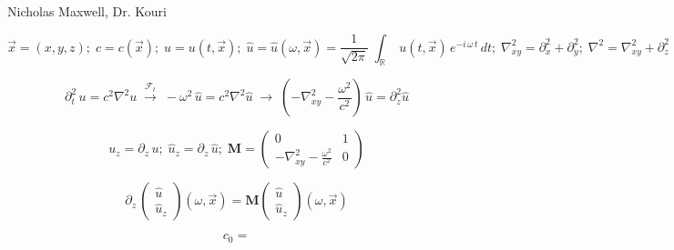 \documentclass[12pt]{article}
\newcommand{\twomat}[4]{ \left( \begin{array}{cc} #1 & #2 \\ #3 & #4  \end{array} \right) }
\newcommand{\twovec}[2]{ \left( \begin{array}{c} #1  \\ #2   \end{array} \right) }
\begin{document}
\begin{flushleft}
Nicholas Maxwell, Dr. Kouri
\end{flushleft}

\begin{equation*}
\vec{x} = (x,y,z); \; c = c(\vec{x}); \; u = u(t,\vec{x}); \; \hat{u} = \hat{u}(\omega,\vec{x}) = \frac{1}{\sqrt{2\pi}}\;\int_\mathbb{R} \; u(t,\vec{x}) \, e^{-i \, \omega \, t}  \, dt ; \; \nabla^2_{xy} = \partial^2_x + \partial^2_y ; \; \nabla^2 = \nabla^2_{xy} + \partial^2_z
\end{equation*}

\begin{equation} 
\partial^2_t \, u = c^2 \nabla^2 u \;  \overset{\mathcal{F}_t}{\longrightarrow} \; - \omega^2 \, \hat{u} = c^2 \nabla^2 \hat{u}  \; \longrightarrow \; \left( - \nabla^2_{xy} - \frac{\omega^2}{c^2} \right) \, \hat{u} =  \partial_z^2 \hat{u} 
\end{equation}

\begin{equation*} 
u_z = \partial_z \, u ; \; \hat{u}_z = \partial_z \, \hat{u}; \; \textbf{M} = \twomat{0}{1}{ - \nabla^2_{xy} - \frac{\omega^2}{c^2}}{0}
\end{equation*}

\begin{equation} 
\partial_z \, \twovec{\hat{u}}{\hat{u}_z}(\omega,\vec{x}) = \textbf{M} \twovec{\hat{u}}{\hat{u}_z}(\omega,\vec{x})
\end{equation}

\begin{equation*} 
c_0 = 
\end{equation*}
\end{document}
